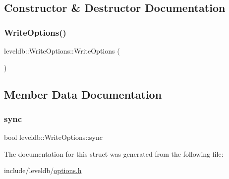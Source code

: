 \subsection{Constructor \& Destructor Documentation}
\mbox{\label{structleveldb_1_1_write_options_a8cdd3e1a65d956d4bcb5e43fa9aee199}} 
\subsubsection{\texorpdfstring{WriteOptions()}{WriteOptions()}}
{\footnotesize\ttfamily leveldb\+::\+Write\+Options\+::\+Write\+Options (\begin{DoxyParamCaption}{ }\end{DoxyParamCaption})\hspace{0.3cm}{\ttfamily [inline]}}



\subsection{Member Data Documentation}
\mbox{\label{structleveldb_1_1_write_options_a07cd165ae5ed59a763001286e14ba47e}} 
\subsubsection{\texorpdfstring{sync}{sync}}
{\footnotesize\ttfamily bool leveldb\+::\+Write\+Options\+::sync}



The documentation for this struct was generated from the following file\+:\begin{DoxyCompactItemize}
\item 
include/leveldb/\mbox{\hyperlink{options_8h}{options.\+h}}\end{DoxyCompactItemize}
